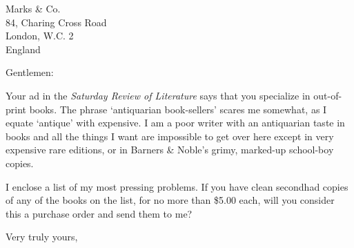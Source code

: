 \documentclass{letter}
\date{October 5, 1949}
\begin{document}
\begin{letter}{Marks \& Co.\\ 84, Charing Cross Road\\London, W.C. 2\\England}
\opening{Gentlemen:}

Your ad in the \textit{Saturday Review of Literature} says that you specialize in out-of-print books. The phrase `antiquarian book-sellers' scares me somewhat, as I equate `antique' with expensive. I am a poor writer with an antiquarian taste in books and all the things I want are impossible to get over here except in very expensive rare editions, or in Barners \& Noble's grimy, marked-up school-boy copies.

I enclose a list of my most pressing problems. If you have clean secondhad copies of any of the books on the list, for no more than \$5.00 each, will you consider this a purchase order and send them to me?

\closing{Very truly yours,}
\end{letter}
\end{document}
